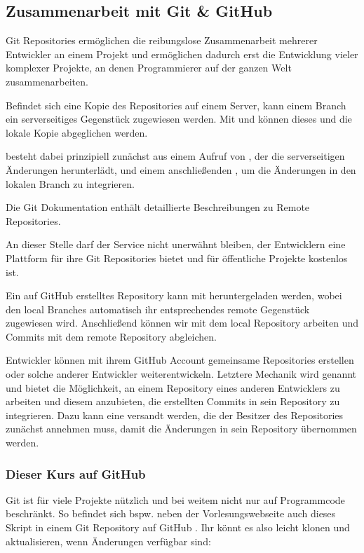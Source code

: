 \documentclass[parskip=half, final]{scrreprt}
\begin{document}
\subsection{Zusammenarbeit mit Git \& GitHub}

Git Repositories ermöglichen die reibungslose Zusammenarbeit mehrerer Entwickler an einem Projekt und ermöglichen dadurch erst die Entwicklung vieler komplexer Projekte, an denen Programmierer auf der ganzen Welt zusammenarbeiten.

Befindet sich eine Kopie des Repositories auf einem Server, kann einem Branch ein serverseitiges Gegenstück zugewiesen werden. Mit  und  können dieses  und die lokale Kopie abgeglichen werden.

 besteht dabei prinzipiell zunächst aus einem Aufruf von , der die serverseitigen Änderungen herunterlädt, und einem anschließenden , um die Änderungen in den lokalen Branch zu integrieren.

Die Git Dokumentation  enthält detaillierte Beschreibungen zu Remote Repositories.

An dieser Stelle darf der Service  nicht unerwähnt bleiben, der Entwicklern eine Plattform für ihre Git Repositories bietet und für öffentliche Projekte kostenlos ist.

Ein auf GitHub erstelltes Repository kann mit  heruntergeladen werden, wobei den local Branches automatisch ihr entsprechendes remote Gegenstück zugewiesen wird. Anschließend können wir mit dem local Repository arbeiten und Commits mit dem remote Repository abgleichen.

Entwickler können mit ihrem GitHub Account gemeinsame Repositories erstellen oder solche anderer Entwickler weiterentwickeln. Letztere Mechanik wird  genannt und bietet die Möglichkeit, an einem Repository eines anderen Entwicklers zu arbeiten und diesem anzubieten, die erstellten Commits in sein Repository zu integrieren. Dazu kann eine  versandt werden, die der Besitzer des Repositories zunächst annehmen muss, damit die Änderungen in sein Repository übernommen werden.

\subsubsection{Dieser Kurs auf GitHub}

Git ist für viele Projekte nützlich und bei weitem nicht nur auf Programmcode beschränkt. So befindet sich bspw. neben der Vorlesungswebseite auch dieses Skript in einem Git Repository auf GitHub . Ihr könnt es also leicht klonen und aktualisieren, wenn Änderungen verfügbar sind:
\end{document}
